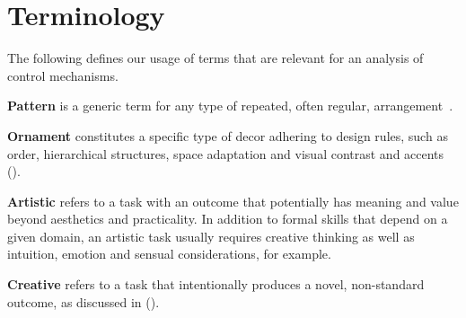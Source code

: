 
\section{Terminology}\label{terminology}
The following defines our usage of terms that are relevant for an analysis of control mechanisms. %

\textbf{Pattern} is a generic term for any type of repeated, often regular, arrangement~\cite{oed_2017}.




\textbf{Ornament} constitutes a specific type of decor adhering to design rules, such as order, hierarchical structures, space adaptation and visual contrast and accents ().

\textbf{Artistic} refers to a task with an outcome that potentially has meaning and value beyond aesthetics and practicality. In addition to formal skills that depend on a given domain, an artistic task usually requires creative thinking as well as intuition, emotion and sensual considerations, for example.

\textbf{Creative} refers to a task that intentionally produces a novel, non-standard outcome, as discussed in (). 

